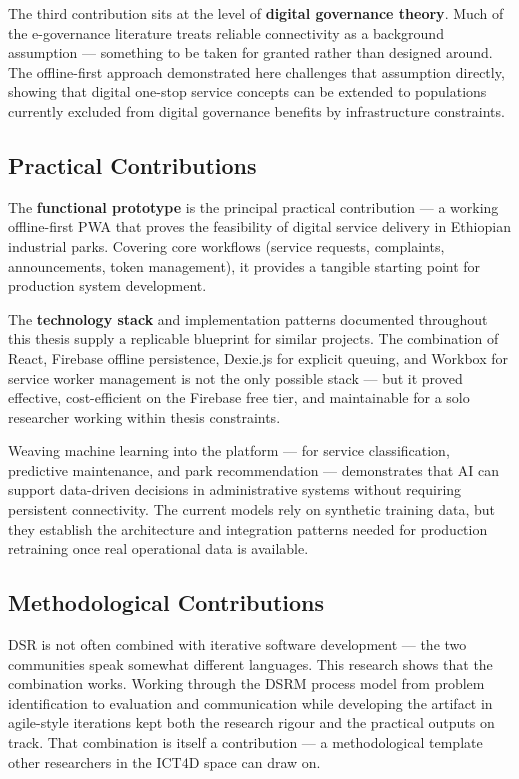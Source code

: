 The third contribution sits at the level of \textbf{digital governance theory}. Much of the e-governance literature treats reliable connectivity as a background assumption --- something to be taken for granted rather than designed around. The offline-first approach demonstrated here challenges that assumption directly, showing that digital one-stop service concepts can be extended to populations currently excluded from digital governance benefits by infrastructure constraints.

\subsection{Practical Contributions}

The \textbf{functional prototype} is the principal practical contribution --- a working offline-first PWA that proves the feasibility of digital service delivery in Ethiopian industrial parks. Covering core workflows (service requests, complaints, announcements, token management), it provides a tangible starting point for production system development.

The \textbf{technology stack} and implementation patterns documented throughout this thesis supply a replicable blueprint for similar projects. The combination of React, Firebase offline persistence, Dexie.js for explicit queuing, and Workbox for service worker management is not the only possible stack --- but it proved effective, cost-efficient on the Firebase free tier, and maintainable for a solo researcher working within thesis constraints.

Weaving machine learning into the platform --- for service classification, predictive maintenance, and park recommendation --- demonstrates that AI can support data-driven decisions in administrative systems without requiring persistent connectivity. The current models rely on synthetic training data, but they establish the architecture and integration patterns needed for production retraining once real operational data is available.

\subsection{Methodological Contributions}

DSR is not often combined with iterative software development --- the two communities speak somewhat different languages. This research shows that the combination works. Working through the DSRM process model from problem identification to evaluation and communication while developing the artifact in agile-style iterations kept both the research rigour and the practical outputs on track. That combination is itself a contribution --- a methodological template other researchers in the ICT4D space can draw on.

